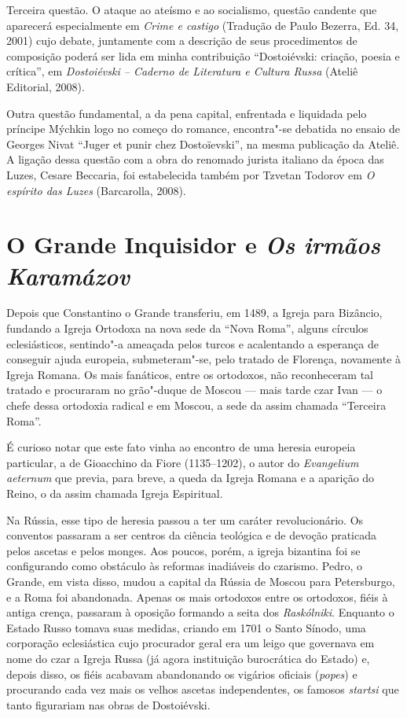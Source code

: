 Terceira questão. O ataque ao ateísmo e ao socialismo, questão candente que aparecerá
especialmente em \emph{Crime e castigo} (Tradução de Paulo Bezerra,
Ed. 34, 2001) cujo debate, juntamente com a descrição de seus
procedimentos de composição poderá ser lida em minha contribuição 
``Dostoiévski: criação, poesia e crítica'', em \emph{Dostoiévski -- Caderno
de Literatura e Cultura Russa} (Ateliê Editorial, 2008).

Outra questão fundamental, a da pena capital, enfrentada e liquidada
pelo príncipe Mýchkin logo no começo do romance, encontra"-se debatida no
ensaio de Georges Nivat ``Juger et punir chez Dostoïevski'', na mesma
publicação da Ateliê. A ligação dessa questão com a obra do renomado
jurista italiano da época das Luzes, Cesare Beccaria, foi estabelecida
também por Tzvetan Todorov em \emph{O espírito das Luzes} (Barcarolla,
2008).

\chapter{O Grande Inquisidor e \emph{Os irmãos Karamázov}}

Depois que Constantino o Grande transferiu, em 1489, a Igreja para
Bizâncio, fundando a Igreja Ortodoxa na nova sede da ``Nova Roma'',
alguns círculos eclesiásticos, sentindo"-a ameaçada pelos turcos e
acalentando a esperança de conseguir ajuda europeia, submeteram"-se, pelo
tratado de Florença, novamente à Igreja Romana. Os mais fanáticos, entre
os ortodoxos, não reconheceram tal tratado e procuraram no grão"-duque de
Moscou --- mais tarde czar Ivan  --- o chefe dessa ortodoxia radical e
em Moscou, a sede da assim chamada ``Terceira Roma''.

É curioso notar que este fato vinha ao encontro de uma heresia europeia
particular, a de Gioacchino da Fiore (1135--1202), o autor do
\emph{Evangelium aeternum} que previa, para breve, a queda da Igreja
Romana e a aparição do  Reino, o da assim chamada Igreja Espiritual.

Na Rússia, esse tipo de heresia passou a ter um caráter revolucionário.
Os conventos passaram a ser centros da ciência teológica e de devoção
praticada pelos ascetas e pelos monges. Aos poucos, porém, a igreja
bizantina foi se configurando como obstáculo às reformas inadiáveis do
czarismo. Pedro, o Grande, em vista disso, mudou a capital da Rússia de
Moscou para Petersburgo, e a  Roma foi abandonada. Apenas os mais
ortodoxos entre os ortodoxos, fiéis à antiga crença, passaram à oposição
formando a seita dos \emph{Raskólniki}. Enquanto o Estado Russo tomava
suas medidas, criando em 1701 o Santo Sínodo, uma corporação
eclesiástica cujo procurador geral era um leigo que governava em nome do
czar a Igreja Russa (já agora instituição burocrática do Estado) e,
depois disso, os fiéis acabavam abandonando os vigários oficiais
(\emph{popes}) e procurando cada vez mais os velhos ascetas
independentes, os famosos \emph{startsi} que tanto figurariam nas obras
de Dostoiévski.

